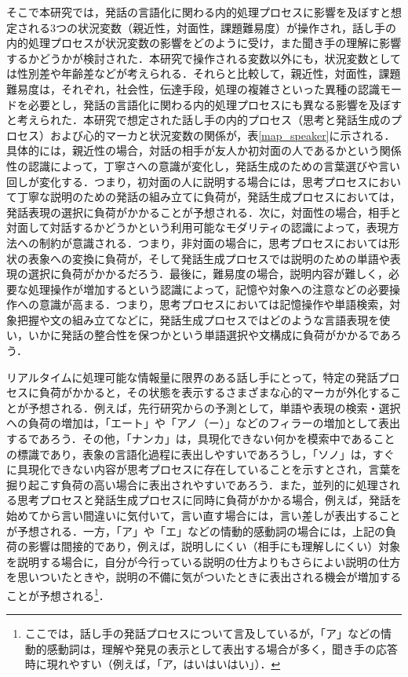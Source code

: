 \documentclass[japanese]{jnlp_1.3a}
\begin{document}
そこで本研究では，発話の言語化に関わる内的処理プロセスに影響を及ぼすと想定される3つの状況変数（親近性，対面性，課題難易度）が操作され，話し手の内的処理プロセスが状況変数の影響をどのように受け，また聞き手の理解に影響するかどうかが検討された．本研究で操作される変数以外にも，状況変数としては性別差や年齢差などが考えられる．それらと比較して，親近性，対面性，課題難易度は，それぞれ，社会性，伝達手段，処理の複雑さといった異種の認識モードを必要とし，発話の言語化に関わる内的処理プロセスにも異なる影響を及ぼすと考えられた．本研究で想定された話し手の内的プロセス（思考と発話生成のプロセス）および心的マーカと状況変数の関係が，表\ref{map_speaker}に示される．具体的には，親近性の場合，対話の相手が友人か初対面の人であるかという関係性の認識によって，丁寧さへの意識が変化し，発話生成のための言葉選びや言い回しが変化する．つまり，初対面の人に説明する場合には，思考プロセスにおいて丁寧な説明のための発話の組み立てに負荷が，発話生成プロセスにおいては，発話表現の選択に負荷がかかることが予想される．次に，対面性の場合，相手と対面して対話するかどうかという利用可能なモダリティの認識によって，表現方法への制約が意識される．つまり，非対面の場合に，思考プロセスにおいては形状の表象への変換に負荷が，そして発話生成プロセスでは説明のための単語や表現の選択に負荷がかかるだろう．最後に，難易度の場合，説明内容が難しく，必要な処理操作が増加するという認識によって，記憶や対象への注意などの必要操作への意識が高まる．つまり，思考プロセスにおいては記憶操作や単語検索，対象把握や文の組み立てなどに，発話生成プロセスではどのような言語表現を使い，いかに発話の整合性を保つかという単語選択や文構成に負荷がかかるであろう．

リアルタイムに処理可能な情報量に限界のある話し手にとって，特定の発話プロセスに負荷がかかると，その状態を表示するさまざまな心的マーカが外化することが予想される．例えば，先行研究からの予測として，単語や表現の検索・選択への負荷の増加は，「エート」や「アノ（ー）」などのフィラーの増加として表出するであろう．その他，「ナンカ」は，具現化できない何かを模索中であることの標識であり，表象の言語化過程に表出しやすいであろうし，「ソノ」は，すぐに具現化できない内容が思考プロセスに存在していることを示すとされ\cite{山根}，言葉を掘り起こす負荷の高い場合に表出されやすいであろう．また，並列的に処理される思考プロセスと発話生成プロセスに同時に負荷がかかる場合，例えば，発話を始めてから言い間違いに気付いて，言い直す場合には，言い差しが表出することが予想される．一方，「ア」や「エ」などの情動的感動詞の場合には，上記の負荷の影響は間接的であり，例えば，説明しにくい（相手にも理解しにくい）対象を説明する場合に，自分が今行っている説明の仕方よりもさらによい説明の仕方を思いついたときや，説明の不備に気がついたときに表出される機会が増加することが予想される\footnote{ここでは，話し手の発話プロセスについて言及しているが，「ア」などの情動的感動詞は，理解や発見の表示として表出する場合が多く，聞き手の応答時に現れやすい（例えば，「ア，はいはいはい」）．}．
\end{document}
